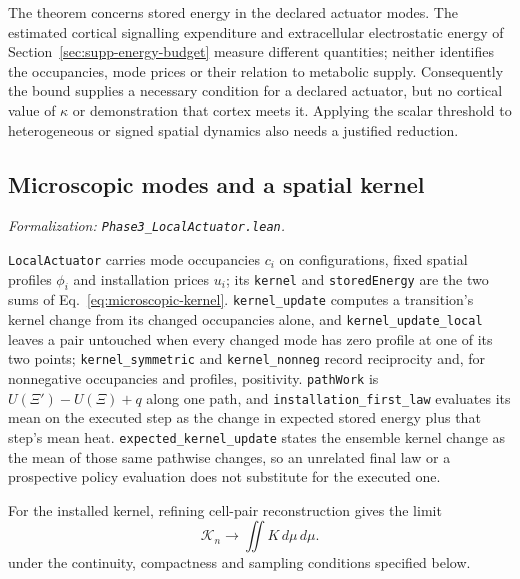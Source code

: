 \documentclass{article}
\begin{document}
The theorem concerns stored energy in the declared actuator modes. The estimated cortical signalling expenditure and extracellular electrostatic energy of Section~\ref{sec:supp-energy-budget} measure different quantities; neither identifies the occupancies, mode prices or their relation to metabolic supply. Consequently the bound supplies a necessary condition for a declared actuator, but no cortical value of $\kappa$ or demonstration that cortex meets it. Applying the scalar threshold to heterogeneous or signed spatial dynamics also needs a justified reduction.


\subsection{Microscopic modes and a spatial kernel}
\label{sec:supp-microscopic}

\textit{Formalization: \nolinkurl{Phase3_LocalActuator.lean}.}

\texttt{LocalActuator} carries mode occupancies $c_i$ on configurations, fixed
spatial profiles $\phi_i$ and installation prices $u_i$; its \texttt{kernel}
and \texttt{storedEnergy} are the two sums of
Eq.~\eqref{eq:microscopic-kernel}. \nolinkurl{kernel_update} computes
a transition's kernel change from its changed occupancies alone, and
\nolinkurl{kernel_update_local} leaves a pair untouched
when every changed mode has zero profile at one of its two points;
\nolinkurl{kernel_symmetric} and \nolinkurl{kernel_nonneg}
record reciprocity and, for nonnegative occupancies and profiles, positivity.
\texttt{pathWork} is $U(\Xi')-U(\Xi)+q$ along one path, and
\nolinkurl{installation_first_law} evaluates its mean on
the executed step as the change in expected stored energy plus that step's mean
heat. \nolinkurl{expected_kernel_update} states the
ensemble kernel change as the mean of those same pathwise changes, so an
unrelated final law or a prospective policy evaluation does not substitute for
the executed one.

For the installed kernel, refining cell-pair reconstruction gives the limit
\begin{equation}
 \mathcal{K}_n\longrightarrow\iint K\,d\mu\,d\mu .
 \label{eq:kernel-limit}
\end{equation}
under the continuity, compactness and sampling conditions specified below.
\end{document}
